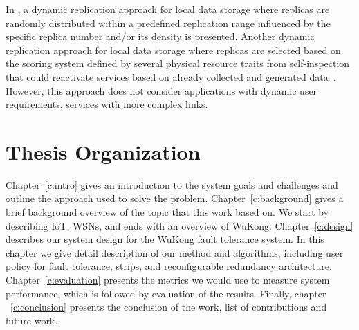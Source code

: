 In \cite{Piotrowski2009}, a dynamic replication approach for local data storage
where replicas are randomly distributed within a predefined replication range
influenced by the specific replica number and/or its density is presented. 
Another dynamic replication approach for local data storage where replicas are
selected based on the scoring system defined by several physical resource traits
from self-inspection that could reactivate services based on already collected
and generated data~\cite{Neumann2010}. However, this approach does not consider
applications with dynamic user requirements, services with more complex links.

\section{Thesis Organization}

Chapter~\ref{c:intro} gives an introduction to the system goals and challenges
and outline the approach used to solve the problem. Chapter~\ref{c:background}
gives a brief background overview of the topic that this work based on.  We
start by describing IoT, WSNs, and ends with an overview of WuKong.
Chapter~\ref{c:design} describes our system design for the WuKong fault
tolerance system. In this chapter we give detail description of our method and
algorithms, including user policy for fault tolerance, strips, and
reconfigurable redundancy architecture.  Chapter~\ref{c:evaluation} presents the
metrics we would use to measure system performance, which is followed by
evaluation of the results. Finally, chapter ~\ref{c:conclusion} presents the
conclusion of the work, list of contributions and future work.
